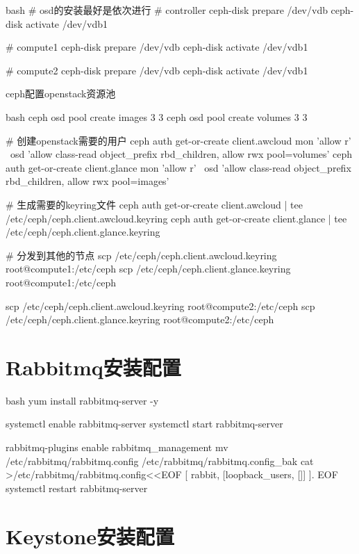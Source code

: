 \begin{outline}[enumerate]
\begin{code-block}{bash}
# osd的安装最好是依次进行
# controller
ceph-disk prepare /dev/vdb
ceph-disk activate /dev/vdb1

# compute1
ceph-disk prepare /dev/vdb
ceph-disk activate /dev/vdb1

# compute2
ceph-disk prepare /dev/vdb
ceph-disk activate /dev/vdb1
\end{code-block}

\1 ceph配置openstack资源池
\begin{code-block}{bash}
ceph osd pool create images 3 3
ceph osd pool create volumes 3 3

# 创建openstack需要的用户
ceph auth get-or-create client.awcloud mon 'allow r' \
    osd 'allow class-read object_prefix rbd_children, allow rwx pool=volumes'
ceph auth get-or-create client.glance mon 'allow r' \
    osd 'allow class-read object_prefix rbd_children, allow rwx pool=images'

# 生成需要的keyring文件
ceph auth get-or-create client.awcloud | tee /etc/ceph/ceph.client.awcloud.keyring
ceph auth get-or-create client.glance | tee /etc/ceph/ceph.client.glance.keyring

# 分发到其他的节点
scp /etc/ceph/ceph.client.awcloud.keyring root@compute1:/etc/ceph
scp /etc/ceph/ceph.client.glance.keyring root@compute1:/etc/ceph

scp /etc/ceph/ceph.client.awcloud.keyring root@compute2:/etc/ceph
scp /etc/ceph/ceph.client.glance.keyring root@compute2:/etc/ceph
\end{code-block}

\end{outline}

\section{Rabbitmq安装配置}
\label{section:rabbitmq_configuration}
\begin{code-block}{bash}
yum install rabbitmq-server -y

systemctl enable rabbitmq-server
systemctl start rabbitmq-server

rabbitmq-plugins enable rabbitmq_management
mv /etc/rabbitmq/rabbitmq.config /etc/rabbitmq/rabbitmq.config_bak
cat >/etc/rabbitmq/rabbitmq.config<<EOF
[
{rabbit, [{loopback_users, []}]}
].
EOF
systemctl restart rabbitmq-server
\end{code-block}

\section{Keystone安装配置}




